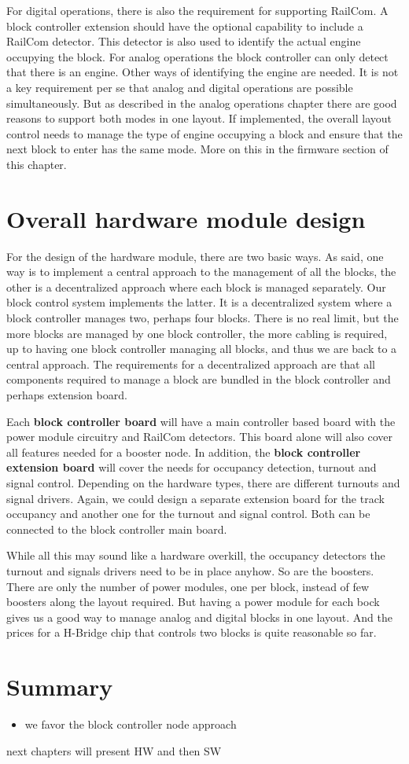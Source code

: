 For digital operations, there is also the requirement for supporting RailCom. A block controller extension should have the optional capability to include a RailCom detector. This detector is also used to identify the actual engine occupying the block. For analog operations the block controller can only detect that there is an engine. Other ways of identifying the engine are needed. It is not a key requirement per se that analog and digital operations are possible simultaneously. But as described in the analog operations chapter there are good reasons to support both modes in one layout. If implemented, the overall layout control needs to manage the type of engine occupying a block and ensure that the next block to enter has the same mode. More on this in the firmware section of this chapter.

\section{Overall hardware module design}

For the design of the hardware module, there are two basic ways. As said, one way is to implement a central approach to the management of all the blocks, the other is a decentralized approach where each block is managed separately. Our block control system implements the latter. It is a decentralized system where a block controller manages two, perhaps four blocks. There is no real limit, but the more blocks are managed by one block controller, the more cabling is required, up to having one block controller managing all blocks, and thus we are back to a central approach. The requirements for a decentralized approach are that all components required to manage a block are bundled in the block controller and perhaps extension board.

Each \textbf{block controller board} will have a main controller based board with the power module circuitry and RailCom detectors. This board alone will also cover all features needed for a booster node. In addition, the\textbf{ block controller extension board} will cover the needs for occupancy detection, turnout and signal control. Depending on the hardware types, there are different turnouts and signal drivers. Again, we could design a separate extension board for the track occupancy and another one for the turnout and signal control. Both can be connected to the block controller main board.

While all this may sound like a hardware overkill, the occupancy detectors the turnout and signals drivers need to be in place anyhow. So are the boosters. There are only the number of power modules, one per block, instead of few boosters along the layout required. But having a power module for each bock gives us a good way to manage analog and digital blocks in one layout. And the prices for a H-Bridge chip that controls two blocks is quite reasonable so far.

\section{Summary}

\begin{itemize}
\item we favor the block controller node approach
\end{itemize}
\item next chapters will present HW and then SW